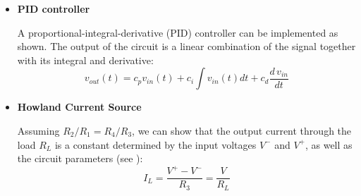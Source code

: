 \begin{itemize}
\item {\bf PID controller}

  A proportional-integral-derivative (PID) controller can be implemented
  as shown. The output of the circuit is a linear combination of the
  signal together with its integral and derivative:
  \[
  v_{out}(t)=c_p v_{in}(t)+c_i \int v_{in}(t) dt +c_d\frac{d\,v_{in}}{dt}
  \]


\item {\bf Howland Current Source}


  Assuming $R_2/R_1=R_4/R_3$, we can show that the output current
  through the load $R_L$ is a constant determined by the input
  voltages $V^-$ and $V^+$, as well as the circuit parameters
  (see ):
  \[
  I_L=\frac{V^+-V^-}{R_3}=\frac{V}{R_L}
  \]

  \begin{comment}
  \[
  \frac{V^--V}{R_1}+\frac{V_0-V}{R_2}=0,\;\;\;\;\;\;
  \frac{V^+-V}{R_3}+\frac{V_0-V}{R_4}=\frac{V}{R_L};
  \]
  Solving the first equation for $V_0-V$:
  \[
  V_0-V=(V-V^-)\frac{R_2}{R_1}=(V-V^-)\frac{R_4}{R_3}
  \]
  and substituting into the second equation, we get:
  \[
  \frac{V^+-V}{R_3}+\frac{V-V^-}{R_3}
  =\frac{V^+-V^-}{R_3}=\frac{V}{R_L}=I_L
  \]
  We see that the current through the load resistor $R_L$
  is constant, independent of $R_L$, i.e., the circuit is
  a current source.
  \end{comment}


\end{itemize}



